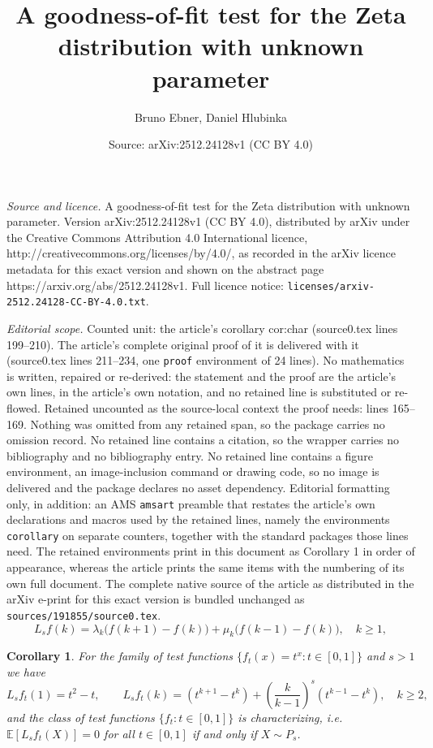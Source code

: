 \documentclass[10pt,a4paper]{amsart}
\title{A goodness-of-fit test for the Zeta distribution with unknown parameter}
\author{Bruno Ebner, Daniel Hlubinka}
\date{Source: arXiv:2512.24128v1 (CC BY 4.0)}
\newtheorem{corollary}{Corollary}
\begin{document}
\maketitle

\noindent\emph{Source and licence.} A goodness-of-fit test for the Zeta distribution with unknown parameter. Version arXiv:2512.24128v1 (CC BY 4.0), distributed by arXiv under the Creative Commons Attribution 4.0 International licence, http://creativecommons.org/licenses/by/4.0/, as recorded in the arXiv licence metadata for this exact version and shown on the abstract page https://arxiv.org/abs/2512.24128v1. Full licence notice: \texttt{licenses/arxiv-2512.24128-CC-BY-4.0.txt}.\par\smallskip

\noindent\textit{Editorial scope.} Counted unit: the article's corollary cor:char (source0.tex lines 199--210). The article's complete original proof of it is delivered with it (source0.tex lines 211--234, one \texttt{proof} environment of 24 lines). No mathematics is written, repaired or re-derived: the statement and the proof are the article's own lines, in the article's own notation, and no retained line is substituted or re-flowed.  Retained uncounted as the source-local context the proof needs: lines 165--169.  Nothing was omitted from any retained span, so the package carries no omission record.  No retained line contains a citation, so the wrapper carries no bibliography and no bibliography entry.  No retained line contains a figure environment, an image-inclusion command or drawing code, so no image is delivered and the package declares no asset dependency.  Editorial formatting only, in addition: an AMS \texttt{amsart} preamble that restates the article's own declarations and macros used by the retained lines, namely the environments \texttt{corollary} on separate counters, together with the standard packages those lines need.  The retained environments print in this document as Corollary 1 in order of appearance, whereas the article prints the same items with the numbering of its own full document.  The complete native source of the article as distributed in the arXiv e-print for this exact version is bundled unchanged as \texttt{sources/191855/source0.tex}.
\begin{equation}\label{eq:SOP}
L_s f(k)
= \lambda_k\big(f(k+1)-f(k)\big)
+ \mu_k\big(f(k-1)-f(k)\big), \quad k\ge1,
\end{equation}

\begin{corollary}\label{cor:char}
For the family of test functions $\{f_t(x) = t^x: t\in[0,1]\}$ and $s>1$ we have
\begin{equation}\label{eq:SOP_PGF}
L_s f_t(1) = t^2 - t,
\qquad
L_s f_t(k)
= \left(t^{k+1}-t^k\right)
+ \left(\frac{k}{k-1}\right)^{s}(t^{k-1}-t^k),
\quad k \ge 2,
\end{equation}
and the class of test functions $\{f_t: t\in[0,1]\}$ is characterizing, i.e. $\mathbb{E}\left[L_s f_t(X)\right] = 0$ for all $t\in[0,1]$ if and only if $X\sim P_s$.
\end{corollary}
\end{document}

